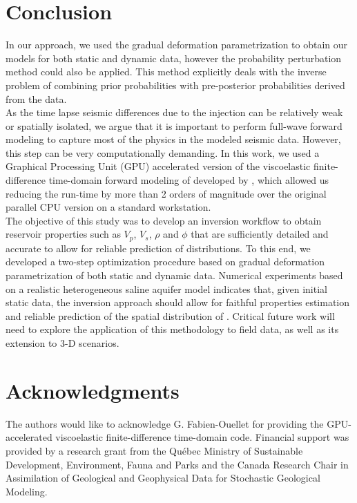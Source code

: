 \section{Conclusion}
In our approach, we used the gradual deformation parametrization to obtain our
models for both static and dynamic data, however the probability perturbation
method \citep{Caers2006} could also be applied. This method explicitly deals
with the inverse problem of combining prior probabilities with pre-posterior
probabilities derived from the data.\\
 As the time lapse seismic differences due to the  injection can be
relatively weak or spatially isolated, we argue that it is important to perform
full-wave forward modeling to capture most of the physics in the modeled seismic
data. However, this step can be very computationally demanding. In this work, we
used a Graphical Processing Unit (GPU) accelerated version of the viscoelastic
finite-difference time-domain forward modeling of \citep{Bohlen2002} developed
by \citep{Gab2014}, which allowed us reducing the run-time by more than 2 orders
of magnitude over the original parallel CPU version on a standard workstation.\\
The objective of this study was to develop an inversion workflow to obtain
reservoir properties such as $V_p$, $V_s$, $\rho$ and $\phi$ that are
sufficiently detailed and accurate to allow for reliable prediction of 
distributions. To this end, we developed a two-step optimization procedure based
on gradual deformation parametrization of both static and dynamic data.
Numerical experiments based on a realistic heterogeneous saline aquifer model
indicates that, given initial static data, the inversion approach should allow
for faithful properties estimation and reliable prediction of the spatial
distribution of . Critical future work will need to explore the
application of this methodology to field data, as well as its extension to 3-D
scenarios.
\section{Acknowledgments}
The authors would like to acknowledge G. Fabien-Ouellet for providing the
GPU-accelerated viscoelastic finite-difference time-domain code. Financial
support was provided by a research grant from the Québec Ministry of Sustainable
Development, Environment, Fauna and Parks and the Canada Research Chair in
Assimilation of Geological and Geophysical Data for Stochastic Geological
Modeling.
